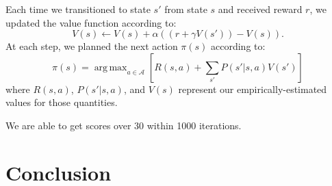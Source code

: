 \documentclass[11pt]{amsart}
\DeclareMathOperator*{\argmax}{arg\,max}
\begin{document}
Each time we transitioned to state $s'$ from state $s$ and received reward $r$, we updated the value function according to:
$$V(s) \gets V(s) + \alpha ((r + \gamma V(s')) - V(s)).$$
At each step, we planned the next action $\pi(s)$ according to:
$$\pi(s) = \argmax_{a \in \mathcal{A}} \left[ R(s,a) + \sum_{s'} P(s'|s,a) V(s') \right]$$
where $R(s,a)$, $P(s'|s,a)$, and $V(s)$ represent our empirically-estimated values for those quantities.

We are able to get scores over 30 within 1000 iterations.

\section{Conclusion}


\begingroup
\begin{thebibliography}{9}


\end{thebibliography}
\endgroup
\end{document}
